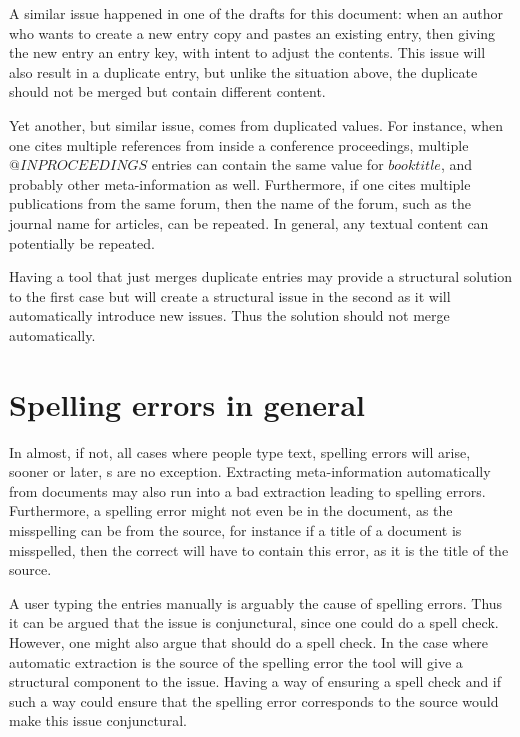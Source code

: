 A similar issue happened in one of the drafts for this document: when
an author who wants to create a new entry copy and pastes an existing
entry, then giving the new entry an entry key, with intent to adjust
the contents.  This issue will also result in a duplicate entry, but
unlike the situation above, the duplicate should not be merged but
contain different content.

Yet another, but similar issue, comes from duplicated values.  For
instance, when one cites multiple references from inside a conference
proceedings, multiple $@INPROCEEDINGS$ entries can contain the same
value for $booktitle$, and probably other meta-information as well.
Furthermore, if one cites multiple publications from the same forum,
then the name of the forum, such as the journal name for articles, can
be repeated.  In general, any textual content can potentially be
repeated.

Having a tool that just merges duplicate entries may provide a
structural solution to the first case but will create a structural
issue in the second as it will automatically introduce new issues.
Thus the solution should not merge automatically.


\section{Spelling errors in general}
\label{sec:problems_spelling}

In almost, if not, all cases where people type text, spelling errors
will arise, sooner or later, s are no exception.  Extracting
meta-information automatically from documents may also run into a bad
extraction leading to spelling errors.  Furthermore, a spelling error
might not even be in the {\bibtex} document, as the misspelling can be
from the source, for instance if a title of a document is misspelled,
then the correct {\bibtex} will have to contain this error, as it is
the title of the source.

A user typing the entries manually is arguably the cause of spelling
errors.  Thus it can be argued that the issue is conjunctural, since
one could do a spell check.  However, one might also argue that
{\bibtex} should do a spell check.  In the case where automatic
extraction is the source of the spelling error the tool will give a
structural component to the issue.  Having a way of ensuring a spell
check and if such a way could ensure that the spelling error
corresponds to the source would make this issue conjunctural.


